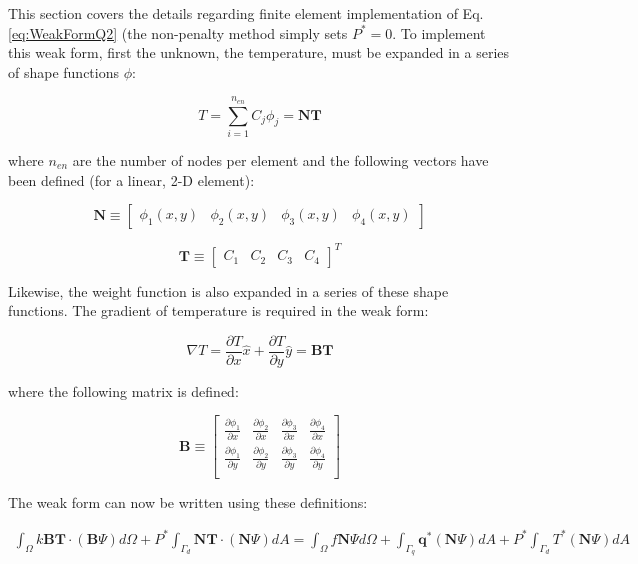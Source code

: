 \documentclass[10pt]{article}
\begin{document}
This section covers the details regarding finite element implementation of Eq. \eqref{eq:WeakFormQ2} (the non-penalty method simply sets \(P^{*}=0\). To implement this weak form, first the unknown, the temperature, must be expanded in a series of shape functions \(\phi\):

\begin{equation}
T=\sum_{i=1}^{n_{en}}C_j\phi_j=\textbf{N}\textbf{T}
\end{equation}

where \(n_{en}\) are the number of nodes per element and the following vectors have been defined (for a linear, 2-D element):

\begin{equation}
\textbf{N}\equiv\begin{bmatrix}\phi_1(x,y) & \phi_2(x,y) & \phi_3(x,y) & \phi_4(x,y)
\end{bmatrix}
\end{equation}

\begin{equation}
\textbf{T}\equiv\begin{bmatrix}C_1 &  C_2 & C_3 & C_4
\end{bmatrix}^T
\end{equation}

Likewise, the weight function is also expanded in a series of these shape functions. The gradient of temperature is required in the weak form:

\begin{equation}
\nabla T=\frac{\partial T}{\partial x}\hat{x}+\frac{\partial T}{\partial y}\hat{y}=\textbf{B}\textbf{T}
\end{equation}

where the following matrix is defined:

\begin{equation}
\textbf{B}\equiv\begin{bmatrix}\frac{\partial \phi_1}{\partial x} & \frac{\partial \phi_2}{\partial x} & \frac{\partial \phi_3}{\partial x} & \frac{\partial \phi_4}{\partial x}\\
\frac{\partial \phi_1}{\partial y} & \frac{\partial \phi_2}{\partial y} & \frac{\partial \phi_3}{\partial y} & \frac{\partial \phi_4}{\partial y}\\
\end{bmatrix}
\end{equation}

The weak form can now be written using these definitions:

\begin{equation}
\label{eq:WeakFormQ3}
\begin{aligned}
\int_{\Omega}k\textbf{B}\textbf{T}\cdot(\textbf{B}\Psi) d\Omega+P^{*}\int_{\Gamma_d}\textbf{N}\textbf{T}\cdot(\textbf{N}\Psi)dA=\int_{\Omega}f\textbf{N}\Psi d\Omega+\int_{\Gamma_q}\textbf{q}^{*}(\textbf{N}\Psi) dA+P^{*}\int_{\Gamma_d}T^{*}(\textbf{N}\Psi) dA\\
\end{aligned}
\end{equation}
\end{document}

